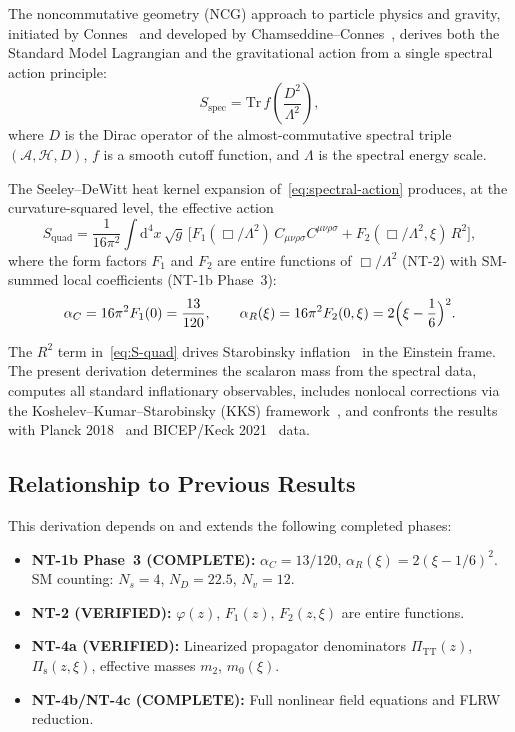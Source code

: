 \documentclass[11pt,a4paper]{article}
\newcommand{\Rsq}{R^2}
\newcommand{\Weylsq}{C_{\mu\nu\rho\sigma}C^{\mu\nu\rho\sigma}}
\renewcommand{\dd}{\mathrm{d}}
\theoremstyle{plain}
\theoremstyle{definition}
\begin{document}
The noncommutative geometry (NCG) approach to particle physics and
gravity, initiated by Connes~\cite{Con94} and developed by
Chamseddine--Connes~\cite{CC97,CC08}, derives both the Standard Model
Lagrangian and the gravitational action from a single spectral action
principle:
\begin{equation}\label{eq:spectral-action}
  S_{\mathrm{spec}} = \mathrm{Tr}\,f\!\left(\frac{D^2}{\Lambda^2}\right),
\end{equation}
where $D$ is the Dirac operator of the almost-commutative spectral
triple $(\mathcal{A}, \mathcal{H}, D)$, $f$ is a smooth cutoff function,
and $\Lambda$ is the spectral energy scale.

The Seeley--DeWitt heat kernel expansion of~\eqref{eq:spectral-action}
produces, at the curvature-squared level, the effective action
\begin{equation}\label{eq:S-quad}
  S_{\mathrm{quad}} = \frac{1}{16\pi^2}\int\dd^4 x\,\sqrt{g}\,
  \bigl[F_1(\Box/\Lambda^2)\,\Weylsq
  + F_2(\Box/\Lambda^2,\xi)\,\Rsq\bigr],
\end{equation}
where the form factors $F_1$ and $F_2$ are entire functions of
$\Box/\Lambda^2$ (NT-2) with SM-summed local coefficients (NT-1b
Phase~3):
\begin{equation}\label{eq:coefficients}
  \alpha_C = 16\pi^2 F_1(0) = \frac{13}{120}, \qquad
  \alpha_R(\xi) = 16\pi^2 F_2(0,\xi)
  = 2\Bigl(\xi - \frac{1}{6}\Bigr)^2.
\end{equation}

The $R^2$ term in~\eqref{eq:S-quad} drives Starobinsky
inflation~\cite{Sta80} in the Einstein frame.  The present derivation
determines the scalaron mass from the spectral data, computes all
standard inflationary observables, includes nonlocal corrections via the
Koshelev--Kumar--Starobinsky (KKS) framework~\cite{KKS20,KKS22}, and
confronts the results with Planck 2018~\cite{Planck18} and BICEP/Keck
2021~\cite{BICEP21} data.

\subsection{Relationship to Previous Results}

This derivation depends on and extends the following completed phases:
\begin{itemize}[nosep]
  \item \textbf{NT-1b Phase~3 (COMPLETE):}
    $\alpha_C = 13/120$, $\alpha_R(\xi) = 2(\xi-1/6)^2$.
    SM counting: $N_s = 4$, $N_D = 22.5$, $N_v = 12$.
  \item \textbf{NT-2 (VERIFIED):}
    $\varphi(z)$, $F_1(z)$, $F_2(z,\xi)$ are entire functions.
  \item \textbf{NT-4a (VERIFIED):}
    Linearized propagator denominators $\Pi_{\mathrm{TT}}(z)$,
    $\Pi_{\mathrm{s}}(z,\xi)$, effective masses $m_2$, $m_0(\xi)$.
  \item \textbf{NT-4b/NT-4c (COMPLETE):}
    Full nonlinear field equations and FLRW reduction.
\end{itemize}
\end{document}
